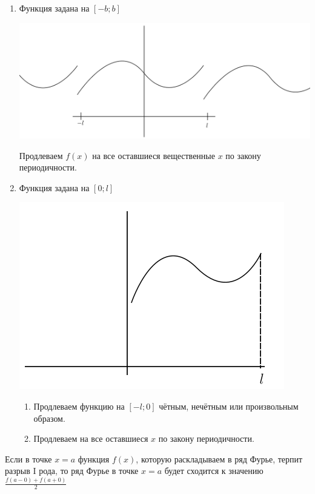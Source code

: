 \documentclass[12pt]{article}
\let\ORIincludegraphics\includegraphics
\renewcommand{\includegraphics}[2][]{\ORIincludegraphics[scale=0.65,#1]{#2}}
\begin{document}
    \begin{enumerate}
      \item Функция задана на $[-b; b]$
      \begin{minipage}{0.45\textwidth}
        \includegraphics[scale=0.6]{10.22.1.png}
      \end{minipage}
      \hspace{1em}
      \begin{minipage}{0.55\textwidth}
        
      \end{minipage}
      \vspace{1em}
      \par
      Продлеваем $f(x)$ на все оставшиеся вещественные $x$ по закону периодичности.
      \item Функция задана на $[0; l]$
      \begin{minipage}{0.45\textwidth}
        \includegraphics[scale=0.6]{10.22.2.png}
      \end{minipage}
      \hspace{1em}
      \begin{minipage}{0.55\textwidth}
        
      \end{minipage}
      \vspace{1em}
      \par
      \begin{enumerate}
          \item Продлеваем функцию на $[-l; 0]$ чётным, нечётным или произвольным образом.
          \item Продлеваем на все оставшиеся $x$ по закону периодичности.
      \end{enumerate}
    \end{enumerate}
    Если в точке $x = a$ функция $f(x)$, которую раскладываем в ряд Фурье, терпит разрыв I рода, то ряд Фурье в точке $x = a$ будет сходится к значению $\frac{f(a - 0) + f(a + 0)}{2}$
  
\end{document}
